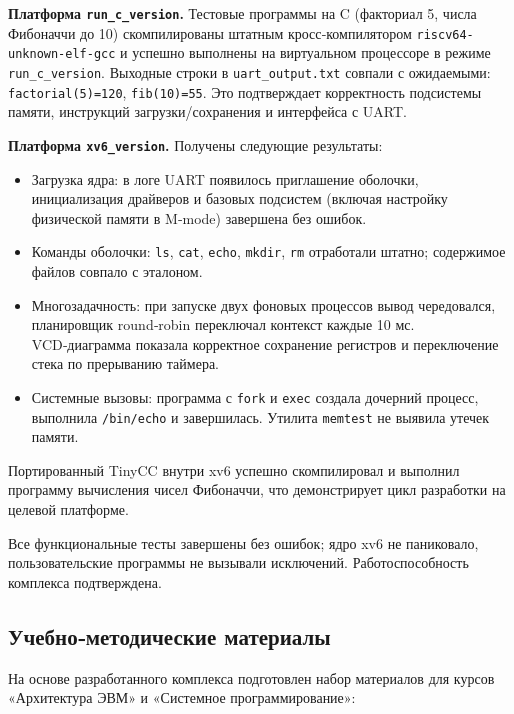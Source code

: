 \textbf{Платформа \texttt{run\_c\_version}.} Тестовые программы на C (факториал 5, числа Фибоначчи до 10) скомпилированы штатным кросс‑компилятором \texttt{riscv64-unknown-elf-gcc} и успешно выполнены на виртуальном процессоре в режиме \texttt{run\_c\_version}. Выходные строки в \texttt{uart\_output.txt} совпали с ожидаемыми: \texttt{factorial(5)=120}, \texttt{fib(10)=55}. Это подтверждает корректность подсистемы памяти, инструкций загрузки/сохранения и интерфейса с UART.

\textbf{Платформа \texttt{xv6\_version}.} Получены следующие результаты:
\begin{itemize}
\item Загрузка ядра: в логе UART появилось приглашение оболочки, инициализация драйверов и базовых подсистем (включая настройку физической памяти в M‑mode) завершена без ошибок.
\item Команды оболочки: \texttt{ls}, \texttt{cat}, \texttt{echo}, \texttt{mkdir}, \texttt{rm} отработали штатно; содержимое файлов совпало с эталоном.
\item Многозадачность: при запуске двух фоновых процессов вывод чередовался, планировщик round‑robin переключал контекст каждые 10 мс. VCD‑диаграмма показала корректное сохранение регистров и переключение стека по прерыванию таймера.
\item Системные вызовы: программа с \texttt{fork} и \texttt{exec} создала дочерний процесс, выполнила \texttt{/bin/echo} и завершилась. Утилита \texttt{memtest} не выявила утечек памяти.
\end{itemize}
Портированный TinyCC внутри xv6 успешно скомпилировал и выполнил программу вычисления чисел Фибоначчи, что демонстрирует цикл разработки на целевой платформе.

Все функциональные тесты завершены без ошибок; ядро xv6 не паниковало, пользовательские программы не вызывали исключений. Работоспособность комплекса подтверждена.

\subsection{Учебно‑методические материалы}

На основе разработанного комплекса подготовлен набор материалов для курсов «Архитектура ЭВМ» и «Системное программирование»:

